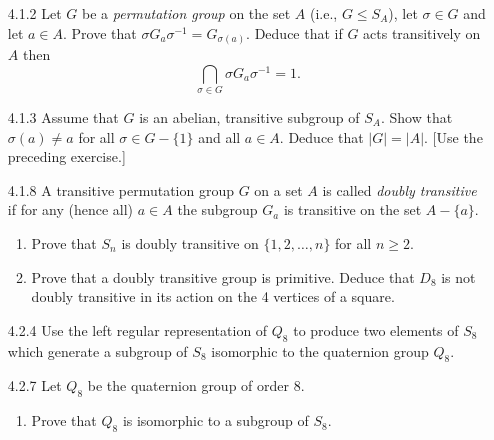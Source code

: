 \documentclass[9pt]{article}
\begin{document}
\begin{enumerate}
   \item[4.1.2]   Let $G$ be a \textit{permutation group} on the set $A$
                  (i.e., $G \le S_A$), let $\sigma \in G$ and let $a \in A$.
                  Prove that $\sigma G_a\sigma^{-1} = G_{\sigma(a)}$. Deduce
                  that if $G$ acts transitively on $A$ then
                  $$\bigcap_{\sigma \in G}\sigma G_a\sigma^{-1} = 1.$$
   \item[4.1.3]   Assume that $G$ is an abelian, transitive subgroup of $S_A$.
                  Show that $\sigma(a) \neq a$ for all $\sigma \in G - \{1\}$
                  and all $a \in A$. Deduce that $|G| = |A|$. [Use the preceding
                  exercise.]
   \item[4.1.8]   A transitive permutation group $G$ on a set $A$ is called
                  \textit{doubly transitive} if for any (hence all) $a \in A$
                  the subgroup $G_a$ is transitive on the set $A - \{a\}$.
                  \begin{enumerate}
                     \item Prove that $S_n$ is doubly transitive on
                           $\{1, 2, \ldots, n\}$ for all $n \ge 2$.
                     \item Prove that a doubly transitive group is primitive.
                           Deduce that $D_8$ is not doubly transitive in its
                           action on the 4 vertices of a square.
                  \end{enumerate}
   \item[4.2.4]   Use the left regular representation of $Q_8$ to produce two
                  elements of $S_8$ which generate a subgroup of $S_8$
                  isomorphic to the quaternion group $Q_8$.
   \item[4.2.7]   Let $Q_8$ be the quaternion group of order 8.
                  \begin{enumerate}
                     \item Prove that $Q_8$ is isomorphic to a subgroup of
                           $S_8$.

\end{enumerate}
\end{enumerate}
\end{document}
